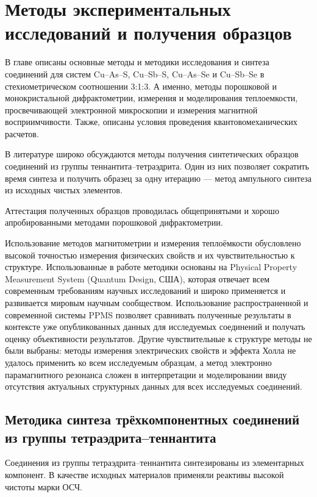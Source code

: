 \chapter{Методы экспериментальных исследований и получения образцов} \label{chapt2}

В главе описаны основные методы и методики исследования и синтеза соединений для систем Cu--As--S, Cu--Sb--S, Cu--As--Se и Cu--Sb--Se в стехиометрическом соотношении 3:1:3. 
А именно, методы порошковой и монокристальной дифрактометрии, измерения и моделирования теплоемкости, просвечивающей электронной микроскопии и измерения магнитной восприимчивости.
Также, описаны условия проведения квантовомеханических расчетов. 

В литературе широко обсуждаются методы получения синтетических образцов соединений из группы теннантита--тетраэдрита. Один из них позволяет сократить время синтеза и получить образец за одну итерацию --- метод ампульного синтеза из исходных чистых элементов. 

Аттестация полученных образцов проводилась общепринятыми и хорошо апробированными методами порошковой дифрактометрии.

Использование методов магнитометрии и измерения теплоёмкости обусловлено высокой точностью измерения физических свойств и их чувствительностью к структуре.
Использованные в работе методики основаны на  Physical Property Measurement System (Quantum Design, США), которая отвечает всем современным требованиям научных исследований и широко применяется и развивается мировым научным сообществом.
Использование распространенной и современной системы PPMS позволяет сравнивать полученные результаты в контексте уже опубликованных данных для исследуемых соединений и получать оценку объективности результатов.
Другие чувствительные к структуре методы не были выбраны: 
методы измерения электрических свойств и эффекта Холла не удалось применить ко всем исследуемым образцам, а  метод электронно парамагнитного резонанса сложен в интерпретации и моделировании ввиду отсутствия актуальных структурных данных для всех исследуемых соединений.

\section{Методика синтеза трёхкомпонентных соединений из группы тетраэдрита--теннантита} \label{sect2_1}

Соединения из группы тетраэдрита--теннантита синтезированы из элементарных компонент. 
В качестве исходных материалов применяли реактивы высокой чистоты марки ОСЧ.

